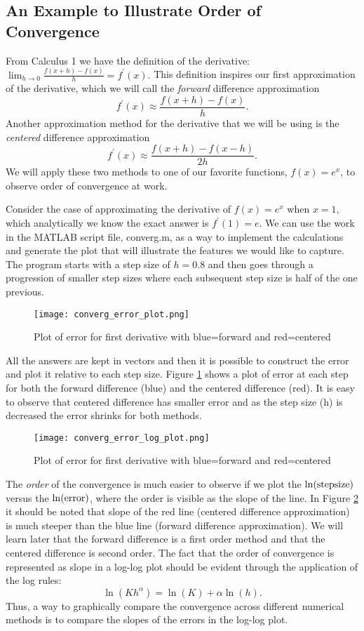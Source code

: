 \documentclass[twoside]{article}
\def\ds{\displaystyle}
\begin{document}
\subsection{An Example to Illustrate Order of Convergence}
From Calculus 1 we have the definition of the derivative: $\ds \lim_{h\rightarrow 0}\frac {f(x+h)-f(x)}h = f^{\prime}(x).$ This definition inspires our first approximation of the derivative, which we will call the {\it forward} difference approximation
$$f^{\prime}(x) \approx \frac {f(x+h)-f(x)}h.$$
Another approximation method for the derivative that we will be using is the {\it centered} difference approximation
$$f^{\prime}(x) \approx \frac {f(x+h)-f(x-h)}{2h}.$$
We will apply these two methods to one of our favorite functions, $\ds f(x)=e^x$, to observe order of convergence at work. 

Consider the case of approximating the derivative of $\ds f(x) = e^x$ when $x=1$, which analytically we know the exact answer is $\ds f^{\prime}(1) = e$. We can use the work in the MATLAB script file, converg.m, as a way to implement the calculations and generate the plot that will illustrate the features we would like to capture. The program starts with a step size of $h = 0.8$ and then goes through a progression of smaller step sizes where each subsequent step size is half of the one previous. 
\begin{figure}[!ht]
\centering
\texttt{[image: converg\_error\_plot.png]}
 \caption{Plot of error for first derivative with blue=forward and red=centered}
 \label{f:converg_error_plot}
\end{figure}
All the answers are kept in vectors and then it is possible to construct the error and plot it relative to each step size. Figure \ref{f:converg_error_plot} shows a plot of error at each step for both the forward difference ({\color{blue}blue}) and the centered difference ({\color{red}red}). It is easy to observe that centered difference has smaller error and as the step size (h) is decreased the error shrinks for both methods. 
\begin{figure}[!ht]
\centering
\texttt{[image: converg\_error\_log\_plot.png]}
 \caption{Plot of error for first derivative with blue=forward and red=centered}
 \label{f:converg_error_log_plot}
\end{figure}
The {\it order} of the convergence is much easier to observe if we plot the $\ds \ln ({\rm step size})$ versus the $\ds \ln ({\rm error})$, where the order is visible as the slope of the line. In Figure \ref{f:converg_error_log_plot} it should be noted that slope of the {\color{red}red} line (centered difference approximation) is much steeper than the {\color{blue}blue} line (forward difference approximation). We will learn later that the forward difference is a first order method and that the centered difference is second order. The fact that the order of convergence is represented as slope in a log-log plot should be evident through the application of the log rules:
$$\ln (Kh^{\alpha}) = \ln (K) + \alpha \ln(h).$$
Thus, a way to graphically compare the convergence across different numerical methods is to compare the slopes of the errors in the log-log plot. 
\end{document}

